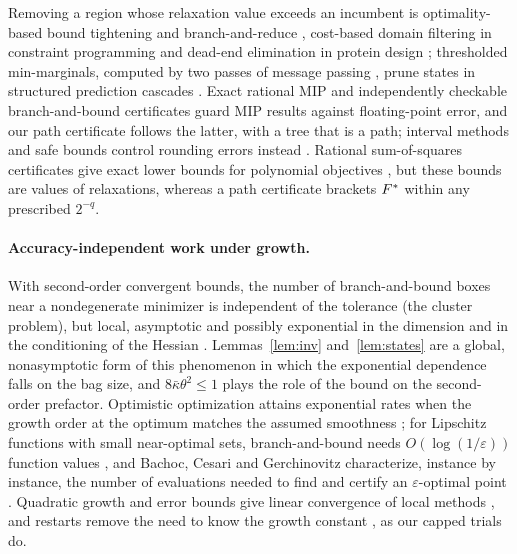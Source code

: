 Removing a region whose relaxation value exceeds an incumbent is
optimality-based bound tightening and branch-and-reduce
\cite{RyooSahinidis1996,BelottiEtAl2009,GleixnerEtAl2017,PuranikSahinidis2017},
cost-based domain filtering in constraint programming
\cite{FocacciLodiMilano1999} and dead-end elimination in protein design
\cite{DesmetEtAl1992,GainzaRobertsDonald2012}; thresholded min-marginals,
computed by two passes of message passing
\cite{Dawid1992,AjiMcEliece2000,WainwrightJaakkolaWillsky2005,KohliTorr2006},
prune states in structured prediction cascades \cite{WeissTaskar2010}. Exact
rational MIP \cite{CookKochSteffyWolter2013,EiflerGleixner2023} and
independently checkable branch-and-bound certificates
\cite{CheungGleixnerSteffy2017} guard MIP results against floating-point
error, and our path certificate follows the latter, with a tree that is a
path; interval methods and safe bounds control rounding errors instead
\cite{Hansen1980,HansenWalster2004,NeumaierShcherbina2004}. Rational
sum-of-squares certificates give exact lower bounds for polynomial objectives
\cite{PeyrlParrilo2008,KaltofenEtAl2008}, but these bounds are values of
relaxations, whereas a path certificate brackets $F^{*}$ within any prescribed
$2^{-q}$.

\paragraph{Accuracy-independent work under growth.}
With second-order convergent bounds, the number of branch-and-bound boxes
near a nondegenerate minimizer is independent of the tolerance (the cluster
problem), but local, asymptotic and possibly exponential in the dimension
and in the conditioning of the Hessian
\cite{DuKearfott1994,Neumaier2004,WechsungSchaberBarton2014,KannanBarton2017}.
Lemmas~\ref{lem:inv} and~\ref{lem:states} are a global, nonasymptotic form of
this phenomenon in which the exponential dependence falls on the bag size,
and $8\bar\kappa\theta^2\le1$ plays the role of the bound on the second-order
prefactor. Optimistic optimization attains exponential rates when the growth
order at the optimum matches the assumed smoothness \cite{Munos2011}; for
Lipschitz functions with small near-optimal sets, branch-and-bound needs
$O(\log(1/\varepsilon))$ function values \cite{Perevozchikov1990}, and
Bachoc, Cesari and Gerchinovitz characterize, instance by instance, the
number of evaluations needed to find and certify an $\varepsilon$-optimal
point \cite{BachocCesariGerchinovitz2021}. Quadratic growth and error bounds
give linear convergence of local methods
\cite{LuoTseng1993,KarimiNutiniSchmidt2016,DrusvyatskiyLewis2018,
NecoaraNesterovGlineur2019}, and restarts remove the need to know the growth
constant \cite{RouletDAspremont2020}, as our capped trials do.


